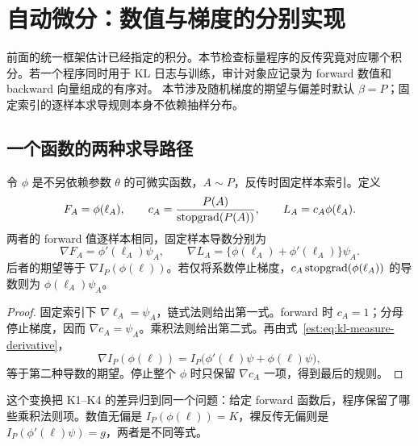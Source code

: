 \section{自动微分：数值与梯度的分别实现}
\label{est:sec:kl-autodiff}
前面的统一框架估计已经指定的积分。本节检查标量程序的反传究竟对应哪个积分。若一个程序同时用于 KL 日志与训练，审计对象应记录为 forward 数值和 backward 向量组成的有序对。
本节涉及随机梯度的期望与偏差时默认 $\beta=P$；固定索引的逐样本求导规则本身不依赖抽样分布。

\subsection{一个函数的两种求导路径}

\begin{theorem}[固定样本反传与采样测度补偿]
\label{est:thm:kl-autodiff-transform}
令 $\phi$ 是不另依赖参数 $\theta$ 的可微实函数，$A\sim P$，反传时固定样本索引。定义
\begin{equation*}
 F_A=\phi(\ell_A),\qquad
 c_A=\frac{P(A)}{\operatorname{stopgrad}(P(A))},\qquad
 L_A=c_A\phi(\ell_A).
\end{equation*}
两者的 forward 值逐样本相同，固定样本导数分别为
\begin{equation*}
 \nabla F_A=\phi'(\ell_A)\psi_A,\qquad
 \nabla L_A=\{\phi(\ell_A)+\phi'(\ell_A)\}\psi_A.
\end{equation*}
后者的期望等于 $\nabla I_P(\phi(\ell))$。若仅将系数停止梯度，$c_A\operatorname{stopgrad}(\phi(\ell_A))$ 的导数则为 $\phi(\ell_A)\psi_A$。
\end{theorem}

\begin{proof}
固定索引下 $\nabla \ell_A=\psi_A$，链式法则给出第一式。forward 时 $c_A=1$；分母停止梯度，因而 $\nabla c_A=\psi_A$。乘积法则给出第二式。再由式~\eqref{est:eq:kl-measure-derivative}，
\begin{equation*}
 \nabla I_P(\phi(\ell))
 =I_P\bigl(\phi'(\ell)\psi+\phi(\ell)\psi\bigr),
\end{equation*}
等于第二种导数的期望。停止整个 $\phi$ 时只保留 $\nabla c_A$ 一项，得到最后的规则。
\end{proof}

这个变换把 K1--K4 的差异归到同一个问题：给定 forward 函数后，程序保留了哪些乘积法则项。数值无偏是 $I_P(\phi(\ell))=K$，裸反传无偏则是 $I_P(\phi'(\ell)\psi)=g$，两者是不同等式。

